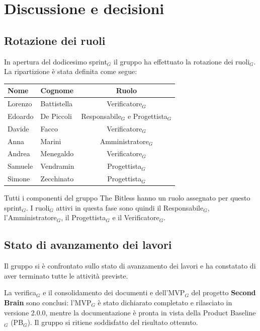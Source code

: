 \documentclass[a4paper, 10pt, colorlinks=true, linkcolor=black, urlcolor=blue, citecolor=blue, hidelinks]{article}
\begin{document}
\section{Discussione e decisioni}

\subsection{Rotazione dei ruoli}
In apertura del dodicesimo sprint$_G$ il gruppo ha effettuato la rotazione dei ruoli$_G$. La ripartizione è stata definita come segue:
\begin{center}
    \begin{tabular}{|l|l|c|}
        \hline
        \textbf{Nome} & \textbf{Cognome} & \textbf{Ruolo} \\
        \hline
        Lorenzo & Battistella & Verificatore$_G$ \\
        \hline
        Edoardo & De Piccoli & Responsabile$_G$ e Progettista$_G$ \\
        \hline
        Davide & Facco & Verificatore$_G$ \\
        \hline
        Anna & Marini & Amministratore$_G$ \\
        \hline
        Andrea & Menegaldo & Verificatore$_G$ \\
        \hline
        Samuele & Vendramin & Progettista$_G$ \\
        \hline
        Simone & Zecchinato & Progettista$_G$ \\
        \hline
    \end{tabular}
\end{center}

\noindent Tutti i componenti del gruppo The Bitless hanno un ruolo assegnato per questo sprint$_G$. I ruoli$_G$ attivi in questa fase sono quindi il Responsabile$_G$, l'Amministratore$_G$, il Progettista$_G$ e il Verificatore$_G$.

\subsection{Stato di avanzamento dei lavori}
Il gruppo si è confrontato sullo stato di avanzamento dei lavori e ha constatato di aver terminato tutte le attività previste.

\noindent La verifica$_G$ e il consolidamento dei documenti e dell'MVP$_G$ del progetto \textbf{Second Brain} sono conclusi: l'MVP$_G$ è stato dichiarato completato e rilasciato in versione 2.0.0, mentre la documentazione è pronta in vista della Product Baseline$_G$ (PB$_G$). Il gruppo si ritiene soddisfatto del risultato ottenuto.
\end{document}
